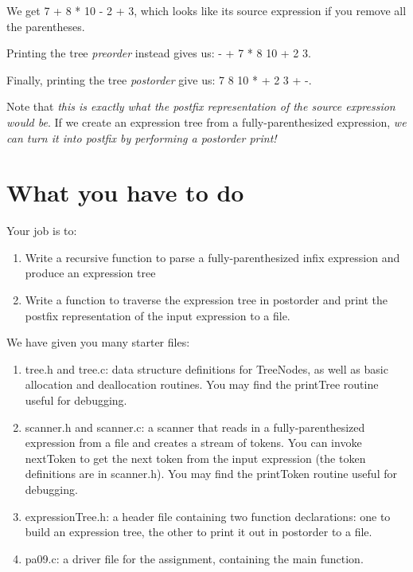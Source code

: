 \documentclass{article}
\begin{document}
We get \textsf{7 + 8 * 10 - 2 + 3}, which looks like its source expression if you remove all the parentheses.


Printing the tree {\em preorder} instead gives us: \textsf{- + 7 * 8 10 + 2 3}.


Finally, printing the tree {\em postorder} give us: \textsf{7 8 10 * + 2 3 + -}.

Note that {\em this is exactly what the postfix representation of the source expression would be}. If we create an expression tree from a fully-parenthesized expression, {\em we can turn it into postfix by performing a postorder print!}

\section{What you have to do}

Your job is to:
\begin{enumerate}
\item    Write a recursive function to parse a fully-parenthesized infix expression and produce an expression tree
\item    Write a function to traverse the expression tree in postorder and print the postfix representation of the input expression to a file.
\end{enumerate}


We have given you many starter files:
\begin{enumerate}
\item    \textsf{tree.h} and \textsf{tree.c}: data structure definitions for \textsf{TreeNode}s, as well as basic allocation and deallocation routines. You may find the \textsf{printTree} routine useful for debugging.
\item    \textsf{scanner.h} and \textsf{scanner.c}: a scanner that reads in a fully-parenthesized expression from a file and creates a stream of tokens. You can invoke \textsf{nextToken} to get the next token from the input expression (the token definitions are in \textsf{scanner.h}). You may find the \textsf{printToken} routine useful for debugging.
\item    \textsf{expressionTree.h}: a header file containing two function declarations: one to build an expression tree, the other to print it out in postorder to a file.
\item    \textsf{pa09.c}: a driver file for the assignment, containing the main function.
\end{enumerate}
\end{document}
